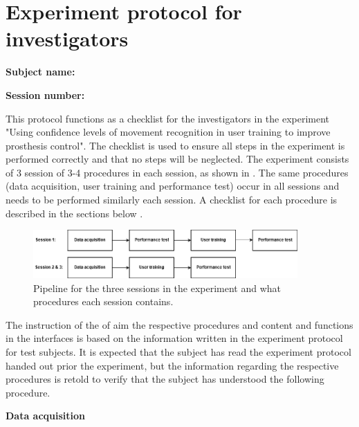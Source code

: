
\section*{Experiment protocol for investigators}

\textbf{Subject name:} 

\textbf{Session number:}

This protocol functions as a checklist for the investigators in the experiment "Using confidence levels of movement recognition in user training to improve prosthesis control". The checklist is used to ensure all steps in the experiment is performed correctly and that no steps will be neglected. The experiment consists of 3 session of 3-4 procedures in each session, as shown in . The same procedures (data acquisition, user training and performance test) occur in all sessions and needs to be performed similarly each session. A checklist for each procedure is described in the sections below .

\begin{figure}[H]                                         
	\includegraphics[width=0.9\textwidth]{figures/pMethods/experiment_protocol_pipeline}  
	\caption{Pipeline for the three sessions in the experiment and what procedures each session contains.}
	\label{fig:experiment_protocol_pipeline_investigators} 
\end{figure} 

The instruction of the of aim the respective procedures and content and functions in the interfaces is based on the information written in the experiment protocol for test subjects. It is expected that the subject has read the experiment protocol handed out prior the experiment, but the information regarding the respective procedures is retold to verify that the subject has understood the following procedure.

\textbf{\large Data acquisition}


